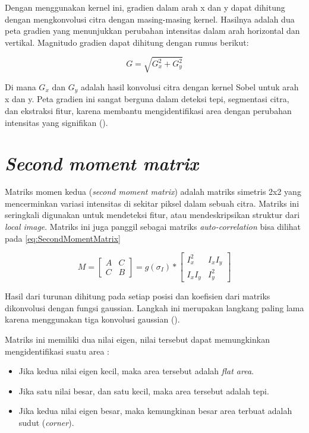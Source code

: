   Dengan menggunakan kernel ini, gradien dalam arah x dan y dapat dihitung dengan mengkonvolusi citra dengan masing-masing kernel. Hasilnya adalah dua peta gradien yang menunjukkan perubahan intensitas dalam arah horizontal dan vertikal. Magnitudo gradien dapat dihitung dengan rumus berikut:

\begin{equation}
  G = \sqrt{G_x^2 + G_y^2}
\end{equation}

  Di mana \(G_x\) dan \(G_y\) adalah hasil konvolusi citra dengan kernel Sobel untuk arah x dan y. Peta gradien ini sangat berguna dalam deteksi tepi, segmentasi citra, dan ekstraksi fitur, karena membantu mengidentifikasi area dengan perubahan intensitas yang signifikan (\cite[hlm. 306--307]{Sanchez2018}).

\section{\emph{Second moment matrix}}
  Matriks momen kedua (\emph{second moment matrix}) adalah matriks simetris 2x2 yang mencerminkan variasi intensitas di sekitar piksel dalam sebuah citra. Matriks ini seringkali digunakan untuk mendeteksi fitur, atau mendeskripsikan struktur dari \emph{local image}.
Matriks ini juga panggil sebagai matriks \emph{auto-correlation} bisa dilihat pada \ref{eq:SecondMomentMatrix}

\begin{equation}
  M = 
    \begin{bmatrix}
      A & C \\
      C & B
    \end{bmatrix}
    = g(\sigma_{I}) *
      \begin{bmatrix}
        I_{x}^2 & I_{x}I_{y} \\
        I_{x}I_{y} & I_{y}^2
      \end{bmatrix}
  \label{eq:SecondMomentMatrix}
\end{equation}

Hasil dari turunan dihitung pada setiap posisi dan koefisien dari matriks dikonvolusi dengan fungsi gaussian. Langkah ini merupakan langkang paling lama karena menggunakan tiga konvolusi gaussian (\cite[hlm. 307]{Sanchez2018}). 

Matriks ini memiliki dua nilai eigen, nilai tersebut dapat memungkinkan mengidentifikasi suatu area :

\begin{itemize}
  \item Jika kedua nilai eigen kecil, maka area tersebut adalah \emph{flat area}.
  \item Jika satu nilai besar, dan satu kecil, maka area tersebut adalah tepi.
  \item Jika kedua nilai eigen besar, maka kemungkinan besar area terbuat adalah sudut (\emph{corner}).
\end{itemize}


